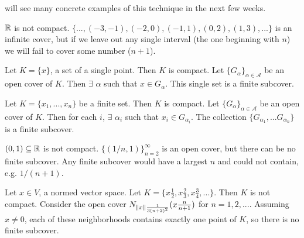will see many concrete examples of this technique in the next few
weeks.
\begin{example}
  $\mathbb{R}$ is not compact. $\{..., (-3, -1), (-2, 0),(-1,1), (0,2), (1,3),
  ... \}$ is an infinite cover, but if we leave out any single
  interval (the one beginning with $n$) we will fail to cover
  some number ($n+1$).
\end{example}
\begin{example}
  Let $K = \{x\}$, a set of a single point. Then $K$ is compact. Let
  $\{G_\alpha\}_{\alpha \in \mathcal{A}}$ be an open cover of
  $K$. Then $\exists$ $\alpha$ such that $x \in G_\alpha$. This single
  set is a finite subcover.
\end{example}
\begin{example}
  Let $K = \{x_1, ..., x_n\}$ be a finite set. Then $K$ is
  compact.  Let
  $\{G_\alpha\}_{\alpha \in \mathcal{A}}$ be an open cover of
  $K$. Then for each $i$, $\exists$ $\alpha_i$ such that $x_i \in
  G_{\alpha_i}$. 
  The collection $\{G_{\alpha_1}, ... G_{\alpha_n} \}$ is a finite
  subcover.
\end{example}
\begin{example}
  $(0,1) \subseteq \mathbb{R}$ is not compact. $\{(1/n,1)\}_{n=2}^\infty$ is
  an open cover, but there can be no finite subcover. Any finite
  subcover would have a largest $n$ and could not contain,
  e.g. $1/(n+1)$. 
\end{example}
\begin{example}
  Let $x \in V$, a normed vector space. Let $K = \{x\frac{1}{2},
  x\frac{2}{3}, x\frac{3}{4}, ... \}$. Then $K$ is not
  compact. Consider the open cover $N_{\left\Vert {x} \right\Vert\frac{1}{3(n+2)^2}}(x
  \frac{n}{n+1})$ for $n=1,2, ...$. Assuming $x \neq 0$, each of these
  neighborhoods contains exactly one point of $K$, so there is no
  finite subcover. 
\end{example}



